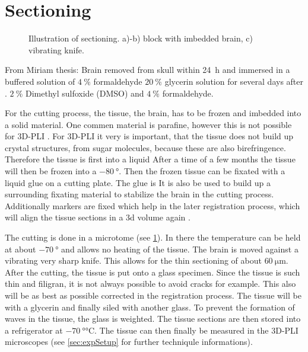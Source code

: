 \section{Sectioning}
%
\begin{figure}[!t]
	\centering
    \setlength{\tikzwidth}{0.75\textwidth}
	\caption{Illustration of sectioning. a)-b) block with imbedded brain, c) vibrating knife.}
	\label{fig:brain_sectioning}
\end{figure}
%
From Miriam thesis:
Brain removed from skull within \SI{24}{\hour} and immersed in a buffered solution of $\SI{4}{\percent}$ formaldehyde
$\SI{20}{\percent}$ glycerin solution for several days after \dummy{}.
$\SI{2}{\percent}$ Dimethyl sulfoxide (DMSO) and $\SI{4}{\percent}$ formaldehyde.
\par
% 
For the cutting process, the tissue, \ie{} the brain, has to be frozen and imbedded into a solid material.
One commen material is parafine, however this is not possible for \ac{3D-PLI} .
For \ac{3D-PLI} it very is important, that the tissue does not build up crystal structures, \eg{} from sugar molecules, because these are also birefringence.
Therefore the tissue is first \dummy{} into a \dummy{} liquid \dummy{}
After a time of a few months the tissue will then be frozen into a $\SI{-80}{\degree}$.
Then the frozen tissue can be fixated with a liquid glue on a cutting plate.
The glue is \dummy{}
It is also be used to build up a surrounding fixating material to stabilize the brain in the cutting process.
Additionally markers are fixed which help in the later registration process, which will align the tissue sections in a 3d volume again \cite{Schober2016,Ali2018,Schmitz2018}.
\par
%
The cutting is done in a microtome (see \cref{fig:brain_sectioning}).
In there the temperature can be held at about $\SI{-70}{\degree}$ and allows no heating of the tissue.
The brain is moved against a vibrating very sharp knife.
This allows for the thin sectioning of about $\SI{60}{\micro\meter}$.
After the cutting, the tissue is put onto a glass specimen.
Since the tissue is such thin and filigran, it is not always possible to avoid cracks for example.
This also will be as best as possible corrected in the registration process.
The tissue will be \dummy{} with a glycerin \dummy{} and finally siled with another glass.
To prevent the formation of waves in the tissue, the glass is weighted.
The tissue sections are then stored into a refrigerator at $\SI{-70}{\degree\celsius}$.
The tissue can then finally be measured in the \ac{3D-PLI} microscopes (see \cref{sec:expSetup} for further techniqule informations).
%
%
